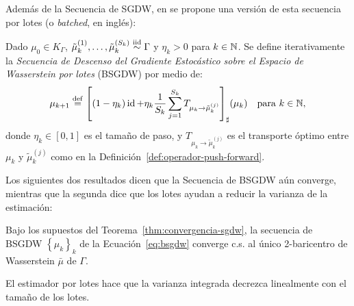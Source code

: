 Además de la Secuencia de SGDW, en \cite{backhoff2022stochastic} se propone una versión de esta secuencia por lotes (o \textit{batched}, en inglés):

\begin{definition}\label{def:bsgdw}
    Dado $\mu_0 \in K_\Gamma$, $\tilde \mu_k^{(1)}, \ldots, \tilde \mu_k^{(S_k)} \stackrel{\mathrm{iid}}{\sim} \Gamma$ y $\eta_k > 0$ para $k \in\mathbb{N}$. Se define iterativamente la \textit{Secuencia de Descenso del Gradiente Estocástico sobre el Espacio de Wasserstein por lotes} (BSGDW) por medio de:
    \begin{equation}
        \label{eq:bsgdw}
        \mu_{k+1} \stackrel{\mathrm{def}}{=} {\qty[
                (1 - \eta_k) \operatorname{id} + \eta_k \frac{1}{S_k} \sum_{j=1}^{S_k} T_{\mu_k \to \tilde \mu_k^{(j)}}
            ]}_{\sharp} (\mu_k) \quad \text{para } k \in\mathbb{N},
    \end{equation}
    donde $\eta_k \in [0, 1]$ es el tamaño de paso, y $T_{\mu_k \to \tilde \mu_k^{(j)}}$ es el transporte óptimo entre $\mu_k$ y $\tilde \mu_k^{(j)}$ como en la Definición~\ref{def:operador-push-forward}.
\end{definition}


Los siguientes dos resultados dicen que la Secuencia de BSGDW aún converge, mientras que la segunda dice que los lotes ayudan a reducir la varianza de la estimación:

\begin{proposition}\label{prop:convergencia-bsgdw}

    Bajo los supuestos del Teorema~\ref{thm:convergencia-sgdw}, la secuencia de BSGDW $\left\{ \mu_k \right\}_k$ de la Ecuación~\eqref{eq:bsgdw} converge c.s. al único 2-baricentro de Wasserstein $\bar \mu$ de $\Gamma$.
\end{proposition}

\begin{proposition}
    El estimador por lotes hace que la varianza integrada decrezca linealmente con el tamaño de los lotes.
\end{proposition}

